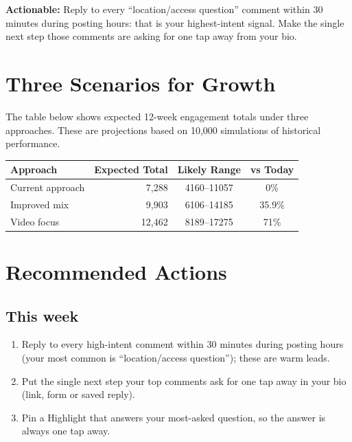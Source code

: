 \documentclass[11pt,a4paper]{article}
\begin{document}
\textbf{Actionable:} Reply to every \textquotedblleft{}location/access question\textquotedblright{} comment within 30 minutes during posting hours: that is your highest-intent signal.
Make the single next step those comments are asking for one tap away from your bio.

\section*{\color{tregreen}Three Scenarios for Growth}

The table below shows expected 12-week engagement totals under three approaches.
These are projections based on 10,000 simulations of historical performance.

\begin{center}
\begin{tabular}{lrcc}
\toprule
\textbf{Approach} & \textbf{Expected Total} & \textbf{Likely Range} & \textbf{vs Today} \\
\midrule
Current approach & 7,288 & 4160–11057 & 0\% \\
Improved mix & 9,903 & 6106–14185 & 35.9\% \\
Video focus & 12,462 & 8189–17275 & 71\% \\
\bottomrule
\end{tabular}
\end{center}

\section*{\color{tregreen}Recommended Actions}

\subsection*{This week}
\begin{enumerate}
  \item Reply to every high-intent comment within 30 minutes during posting hours (your most common is \textquotedblleft{}location/access question\textquotedblright{}); these are warm leads.
  \item Put the single next step your top comments ask for one tap away in your bio (link, form or saved reply).
  \item Pin a Highlight that answers your most-asked question, so the answer is always one tap away.
\end{enumerate}
\end{document}
